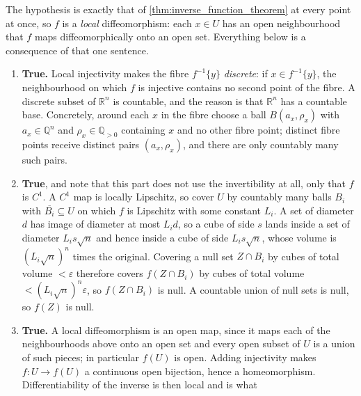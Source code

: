 \begin{exercisesolution}
\label{sol:local_diffeomorphism_four_consequences}
The hypothesis is exactly that of \cref{thm:inverse_function_theorem} at every point at once, so
$f$ is a \emph{local} diffeomorphism: each $x \in U$ has an open neighbourhood that $f$ maps
diffeomorphically onto an open set. Everything below is a consequence of that one sentence.
\begin{enumerate}[label=\textbf{(\alph*)}]
  \item \textbf{True.} Local injectivity makes the fibre $f^{-1}\{y\}$ \emph{discrete}: if
    $x \in f^{-1}\{y\}$, the neighbourhood on which $f$ is injective contains no second point of
    the fibre. A discrete subset of $\mathbb{R}^n$ is countable, and the reason is that
    $\mathbb{R}^n$ has a countable base. Concretely, around each $x$ in the fibre choose a ball
    $B(a_x,\rho_x)$ with $a_x \in \mathbb{Q}^n$ and $\rho_x \in \mathbb{Q}_{>0}$ containing $x$
    and no other fibre point; distinct fibre points receive distinct pairs $(a_x,\rho_x)$, and
    there are only countably many such pairs.
  \item \textbf{True}, and note that this part does not use the invertibility at all, only that
    $f$ is $C^1$. A $C^1$ map is locally Lipschitz, so cover $U$ by countably many balls $B_i$
    with $\overline{B_i} \subseteq U$ on which $f$ is Lipschitz with some constant $L_i$. A set of diameter $d$ has
    image of diameter at most $L_id$, so a cube of side $s$ lands inside a set of diameter
    $L_i s\sqrt n$ and hence inside a cube of side $L_i s\sqrt n$, whose volume is
    $(L_i\sqrt n)^n$ times the original. Covering a null set $Z \cap B_i$ by cubes of total
    volume $< \varepsilon$ therefore covers $f(Z \cap B_i)$ by cubes of total volume
    $< (L_i\sqrt n)^n\varepsilon$, so $f(Z\cap B_i)$ is null. A countable union of null sets is
    null, so $f(Z)$ is null.
  \item \textbf{True.} A local diffeomorphism is an open map, since it maps each of the
    neighbourhoods above onto an open set and every open subset of $U$ is a union of such pieces;
    in particular $f(U)$ is open. Adding injectivity makes $f : U \to f(U)$ a continuous open
    bijection, hence a homeomorphism. Differentiability of the inverse is then local and is what

\end{enumerate}
\end{exercisesolution}

